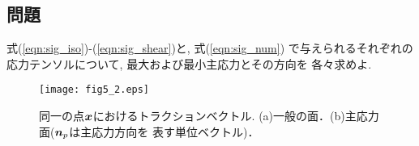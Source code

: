 \documentclass[10pt,a4j]{jarticle}
\begin{document}
\subsection{問題}
式(\ref{eqn:sig_iso})-(\ref{eqn:sig_shear})と, 式(\ref{eqn:sig_num})
で与えられるそれぞれの応力テンソルについて, 最大および最小主応力とその方向を
各々求めよ. 
\begin{figure}[h]
	\begin{center}
	\texttt{[image: fig5\_2.eps]} 
	\end{center}
	\caption{
	同一の点$\mbox{\boldmath $x$}$におけるトラクションベクトル.
	(a)一般の面．(b)主応力面($\mbox{\boldmath $n$}_p$は主応力方向を
	表す単位ベクトル)．
	 } 
	\label{fig:fig5_2}
\end{figure}
\end{document}
